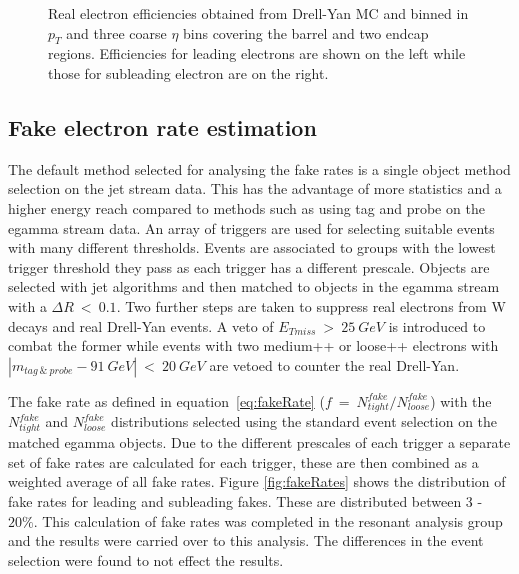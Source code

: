\begin{figure}[h]
\begin{center}
      \end{center}
   \caption{Real electron efficiencies obtained from Drell-Yan MC and binned in $p_{T}$ and three coarse $\eta$ bins covering the barrel and two endcap regions. Efficiencies for leading electrons are shown on the left while those for subleading electron are on the right.}
   \label{fig:realEff}
   \end{figure}



\subsection{Fake electron rate estimation}

The default method selected for analysing the fake rates is a single object method selection on the jet stream data. This has the advantage of more statistics and a higher energy reach compared to methods such as using tag and probe on the egamma stream data.
An array of triggers are used for selecting suitable events with many different thresholds. 
Events are associated to groups with the lowest trigger threshold they pass as each trigger has a different prescale. Objects are selected with jet algorithms and then matched to objects in the egamma stream with a $\Delta R~<~0.1$. Two further steps are taken to suppress real electrons from W decays and real Drell-Yan events. A veto of $E_{Tmiss}~>~25~GeV$ is introduced to combat the former while events with two medium++ or loose++ electrons with $|m_{tag~\&~probe}-91~GeV|~<~20~GeV$ are vetoed to counter the real Drell-Yan.

The fake rate as defined in equation~\ref{eq:fakeRate} ($f~=~N^{fake}_{tight}/N^{fake}_{loose}$) with the $N^{fake}_{tight}$ and $N^{fake}_{loose}$ distributions selected using the standard event selection on the matched egamma objects.
Due to the different prescales of each trigger a separate set of fake rates are calculated for each trigger, these are then combined as a weighted average of all fake rates. Figure \ref{fig:fakeRates} shows the distribution of fake rates for leading and subleading fakes. These are distributed between 3 - $20\%$. This calculation of fake rates was completed in the resonant analysis group and the results were carried over to this analysis. The differences in the event selection were found to not effect the results.

